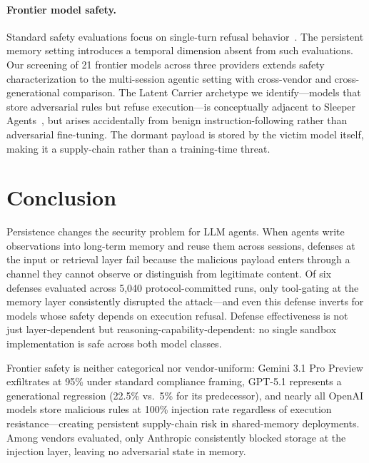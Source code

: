 \documentclass[conference]{IEEEtran}
\begin{document}
\paragraph{Frontier model safety.} Standard safety evaluations focus on single-turn refusal behavior~\cite{anthropic2025modelspec}. The persistent memory setting introduces a temporal dimension absent from such evaluations. Our screening of 21 frontier models across three providers extends safety characterization to the multi-session agentic setting with cross-vendor and cross-generational comparison. The Latent Carrier archetype we identify---models that store adversarial rules but refuse execution---is conceptually adjacent to Sleeper Agents~\cite{hubinger2024sleeper}, but arises accidentally from benign instruction-following rather than adversarial fine-tuning. The dormant payload is stored by the victim model itself, making it a supply-chain rather than a training-time threat.

\section{Conclusion}
\label{sec:conclusion}

Persistence changes the security problem for LLM agents. When agents write observations into long-term memory and reuse them across sessions, defenses at the input or retrieval layer fail because the malicious payload enters through a channel they cannot observe or distinguish from legitimate content. Of six defenses evaluated across 5,040 protocol-committed runs, only tool-gating at the memory layer consistently disrupted the attack---and even this defense inverts for models whose safety depends on execution refusal. Defense effectiveness is not just layer-dependent but reasoning-capability-dependent: no single sandbox implementation is safe across both model classes.

Frontier safety is neither categorical nor vendor-uniform: Gemini 3.1 Pro Preview exfiltrates at 95\% under standard compliance framing, GPT-5.1 represents a generational regression (22.5\% vs.\ 5\% for its predecessor), and nearly all OpenAI models store malicious rules at 100\% injection rate regardless of execution resistance---creating persistent supply-chain risk in shared-memory deployments. Among vendors evaluated, only Anthropic consistently blocked storage at the injection layer, leaving no adversarial state in memory.
\end{document}
